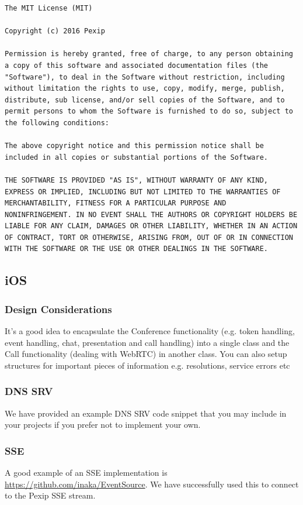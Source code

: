 \documentclass[a4paper,11pt]{article}
\begin{document}
\begin{verbatim}
The MIT License (MIT)

Copyright (c) 2016 Pexip

Permission is hereby granted, free of charge, to any person obtaining
a copy of this software and associated documentation files (the
"Software"), to deal in the Software without restriction, including
without limitation the rights to use, copy, modify, merge, publish,
distribute, sub license, and/or sell copies of the Software, and to
permit persons to whom the Software is furnished to do so, subject to
the following conditions:

The above copyright notice and this permission notice shall be
included in all copies or substantial portions of the Software.

THE SOFTWARE IS PROVIDED "AS IS", WITHOUT WARRANTY OF ANY KIND,
EXPRESS OR IMPLIED, INCLUDING BUT NOT LIMITED TO THE WARRANTIES OF
MERCHANTABILITY, FITNESS FOR A PARTICULAR PURPOSE AND
NONINFRINGEMENT. IN NO EVENT SHALL THE AUTHORS OR COPYRIGHT HOLDERS BE
LIABLE FOR ANY CLAIM, DAMAGES OR OTHER LIABILITY, WHETHER IN AN ACTION
OF CONTRACT, TORT OR OTHERWISE, ARISING FROM, OUT OF OR IN CONNECTION
WITH THE SOFTWARE OR THE USE OR OTHER DEALINGS IN THE SOFTWARE.
\end{verbatim}

\subsection{iOS}
\label{sec:org0a534bf}
\subsubsection{Design Considerations}
\label{sec:org2b367de}
\label{orge4d2f65}
It's a good idea to encapsulate the Conference functionality
(e.g. token handling, event handling, chat, presentation and call
handling) into a single class and the Call functionality (dealing with
WebRTC) in another class.  You can also setup structures for important
pieces of information e.g. resolutions, service errors etc

\subsubsection{DNS SRV}
\label{sec:org2910bd6}
\label{org5032cb9}
We have provided an example DNS SRV code snippet that you may include
in your projects if you prefer not to implement your own.

\subsubsection{SSE}
\label{sec:org6446cfc}
A good example of an SSE implementation is
\url{https://github.com/inaka/EventSource}.  We have successfully used this
to connect to the Pexip SSE stream.
\end{document}
